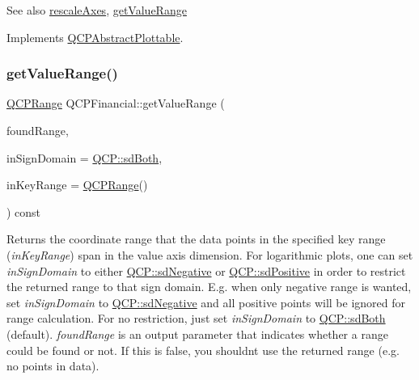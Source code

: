 \begin{DoxySeeAlso}{See also}
\mbox{\hyperlink{class_q_c_p_abstract_plottable_a1491c4a606bccd2d09e65e11b79eb882}{rescale\+Axes}}, \mbox{\hyperlink{class_q_c_p_financial_a82d862aa134d78853f98f8c57a03415b}{get\+Value\+Range}} 
\end{DoxySeeAlso}


Implements \mbox{\hyperlink{class_q_c_p_abstract_plottable_a4da16d3cd4b509e1104a9b0275623c96}{Q\+C\+P\+Abstract\+Plottable}}.

\mbox{\label{class_q_c_p_financial_a82d862aa134d78853f98f8c57a03415b}} 
\subsubsection{\texorpdfstring{get\+Value\+Range()}{getValueRange()}}
{\footnotesize\ttfamily \mbox{\hyperlink{class_q_c_p_range}{Q\+C\+P\+Range}} Q\+C\+P\+Financial\+::get\+Value\+Range (\begin{DoxyParamCaption}\item[{bool \&}]{found\+Range,  }\item[{\mbox{\hyperlink{namespace_q_c_p_afd50e7cf431af385614987d8553ff8a9}{Q\+C\+P\+::\+Sign\+Domain}}}]{in\+Sign\+Domain = {\ttfamily \mbox{\hyperlink{namespace_q_c_p_afd50e7cf431af385614987d8553ff8a9aa38352ef02d51ddfa4399d9551566e24}{Q\+C\+P\+::sd\+Both}}},  }\item[{const \mbox{\hyperlink{class_q_c_p_range}{Q\+C\+P\+Range}} \&}]{in\+Key\+Range = {\ttfamily \mbox{\hyperlink{class_q_c_p_range}{Q\+C\+P\+Range}}()} }\end{DoxyParamCaption}) const\hspace{0.3cm}{\ttfamily [virtual]}}

Returns the coordinate range that the data points in the specified key range ({\itshape in\+Key\+Range}) span in the value axis dimension. For logarithmic plots, one can set {\itshape in\+Sign\+Domain} to either \mbox{\hyperlink{namespace_q_c_p_afd50e7cf431af385614987d8553ff8a9a2d18af0bc58f6528d1e82ce699fe4829}{Q\+C\+P\+::sd\+Negative}} or \mbox{\hyperlink{namespace_q_c_p_afd50e7cf431af385614987d8553ff8a9a584784b75fb816abcc627cf743bb699f}{Q\+C\+P\+::sd\+Positive}} in order to restrict the returned range to that sign domain. E.\+g. when only negative range is wanted, set {\itshape in\+Sign\+Domain} to \mbox{\hyperlink{namespace_q_c_p_afd50e7cf431af385614987d8553ff8a9a2d18af0bc58f6528d1e82ce699fe4829}{Q\+C\+P\+::sd\+Negative}} and all positive points will be ignored for range calculation. For no restriction, just set {\itshape in\+Sign\+Domain} to \mbox{\hyperlink{namespace_q_c_p_afd50e7cf431af385614987d8553ff8a9aa38352ef02d51ddfa4399d9551566e24}{Q\+C\+P\+::sd\+Both}} (default). {\itshape found\+Range} is an output parameter that indicates whether a range could be found or not. If this is false, you shouldn\textquotesingle{}t use the returned range (e.\+g. no points in data).

